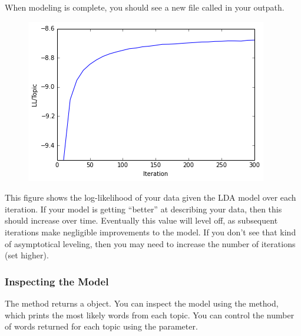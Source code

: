 \documentclass[letterpaper,10pt,english]{sphinxmanual}
\begin{document}
When modeling is complete, you should see a new file called  in your outpath.
\begin{figure}[htbp]
\centering

\includegraphics{ldamodel_LL.png}
\end{figure}

This figure shows the log-likelihood of your data given the LDA model over each iteration.
If your model is getting ``better'' at describing your data, then this should increase
over time. Eventually this value will level off, as subsequent iterations make negligible
improvements to the model. If you don't see that kind of asymptotical leveling, then you
may need to increase the number of iterations (set  higher).


\subsubsection{Inspecting the Model}
\label{tutorial.mallet:inspecting-the-model}
The  method returns a {\hyperref[tethne.model.corpus.ldamodel:tethne.model.corpus.ldamodel.LDAModel]{}} object. You can
inspect the model using the  method, which prints the most
likely words from each topic. You can control the number of words returned for each topic
using the  parameter.
\end{document}
